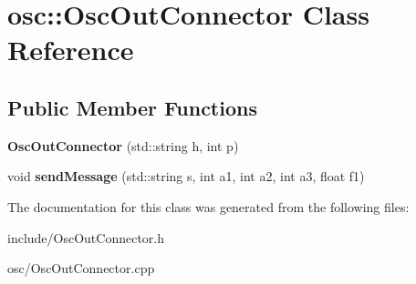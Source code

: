 \hypertarget{classosc_1_1OscOutConnector}{}\section{osc\+:\+:Osc\+Out\+Connector Class Reference}
\label{classosc_1_1OscOutConnector}
\subsection*{Public Member Functions}
\begin{DoxyCompactItemize}
\item 
{\bfseries Osc\+Out\+Connector} (std\+::string h, int p)\hypertarget{classosc_1_1OscOutConnector_a7dde00203135c4a673e56f02dec774b4}{}\label{classosc_1_1OscOutConnector_a7dde00203135c4a673e56f02dec774b4}

\item 
void {\bfseries send\+Message} (std\+::string s, int a1, int a2, int a3, float f1)\hypertarget{classosc_1_1OscOutConnector_a8b3bcadf0295998b42753161ae9d17ee}{}\label{classosc_1_1OscOutConnector_a8b3bcadf0295998b42753161ae9d17ee}

\end{DoxyCompactItemize}


The documentation for this class was generated from the following files\+:\begin{DoxyCompactItemize}
\item 
include/Osc\+Out\+Connector.\+h\item 
osc/Osc\+Out\+Connector.\+cpp\end{DoxyCompactItemize}
